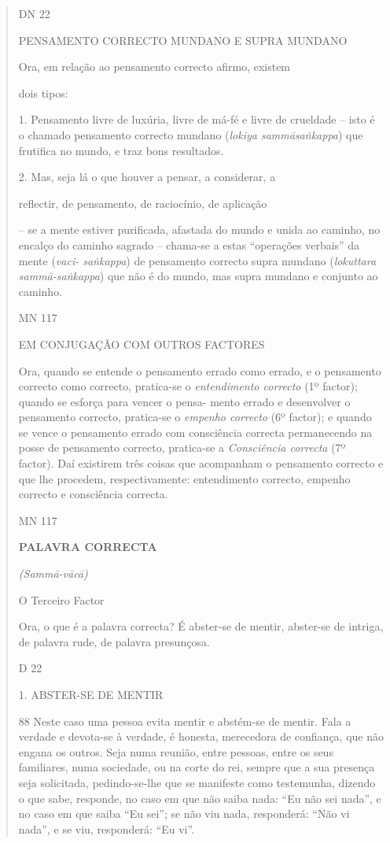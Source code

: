 \begin{quote}
DN 22

PENSAMENTO CORRECTO MUNDANO E SUPRA MUNDANO

Ora, em relação ao pensamento correcto afirmo, existem

dois tipos:

1. Pensamento livre de luxúria, livre de má-fé e livre de crueldade -- isto é o chamado pensamento correcto mundano (\emph{lokiya sammāsaṅkappa}) que frutifica no mundo, e traz bons resultados.

2. Mas, seja lá o que houver a pensar, a considerar, a

reflectir, de pensamento, de raciocínio, de aplicação

-- se a mente estiver purificada, afastada do mundo e unida ao caminho, no encalço do caminho sagrado -- chama-se a estas ``operações verbais'' da mente (\emph{vaci- saṅkappa}) de pensamento correcto supra mundano (\emph{lokuttara sammā-saṅkappa}) que não é do mundo, mas supra mundano e conjunto ao caminho.

MN 117

EM CONJUGAÇÃO COM OUTROS FACTORES

Ora, quando se entende o pensamento errado como errado, e o pensamento correcto como correcto, pratica-se o \emph{entendimento correcto} (1º factor); quando se esforça para vencer o pensa- mento errado e desenvolver o pensamento correcto, pratica-se o \emph{empenho correcto} (6º factor); e quando se vence o pensamento errado com consciência correcta permanecendo na posse de pensamento correcto, pratica-se a \emph{Consciência correcta} (7º factor). Daí existirem três coisas que acompanham o pensamento correcto e que lhe procedem, respectivamente: entendimento correcto, empenho correcto e consciência correcta.

MN 117

\textbf{PALAVRA CORRECTA}

\emph{(Sammā-vācā)}

O Terceiro Factor

Ora, o que é a palavra correcta? É abster-se de mentir, abster-se de intriga, de palavra rude, de palavra presunçosa.

D 22

1. ABSTER-SE DE MENTIR

88 Neste caso uma pessoa evita mentir e abstém-se de mentir. Fala a verdade e devota-se à verdade, é honesta, merecedora de confiança, que não engana os outros. Seja numa reunião, entre pessoas, entre os seus familiares, numa sociedade, ou na corte do rei, sempre que a sua presença seja solicitada, pedindo-se-lhe que se manifeste como testemunha, dizendo o que sabe, responde, no caso em que não saiba nada: ``Eu não sei nada'', e no caso em que saiba ``Eu sei''; se não viu nada, responderá: ``Não vi nada'', e se viu, responderá: ``Eu vi''.


\end{quote}
